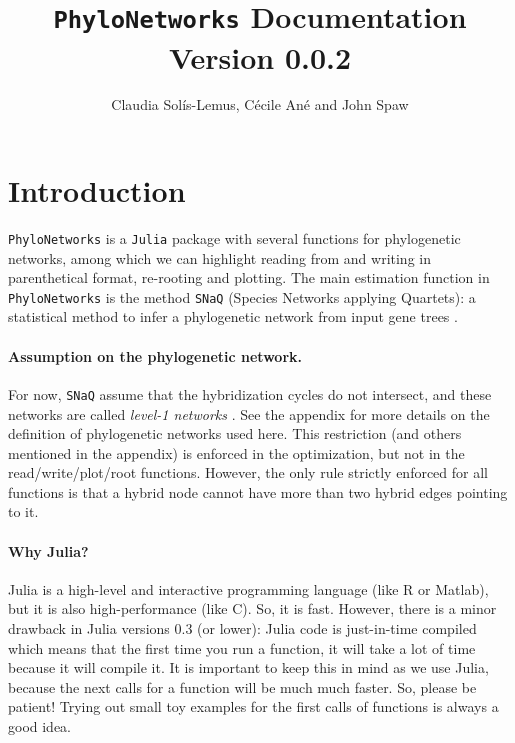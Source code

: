 \documentclass[12pt]{article}
\title{\texttt{PhyloNetworks} Documentation\\
 \large Version 0.0.2}
\author{Claudia Sol\'{i}s-Lemus, C\'{e}cile An\'{e} and John Spaw}
\begin{document}

\maketitle

\section{Introduction}
\texttt{PhyloNetworks} is a \texttt{Julia} package with several
functions for phylogenetic networks, among which we can highlight
reading from and writing in parenthetical format, re-rooting and
plotting.  The main estimation function in \texttt{PhyloNetworks} is
the method \texttt{SNaQ} (Species Networks applying Quartets): a
statistical method to infer a phylogenetic network from input gene
trees \citep{Solis-Lemus2015}.

\paragraph{Assumption on the phylogenetic network.} For now,
\texttt{SNaQ} assume that the hybridization cycles do not intersect,
and these networks are called \textit{level-1 networks}
\citep{Huson2010}. See the appendix for more details on the definition
of phylogenetic networks used here.  This restriction (and others
mentioned in the appendix) is enforced in the optimization, but not in
the read/write/plot/root functions. However, the only rule strictly
enforced for all functions is that a hybrid node cannot have more than
two hybrid edges pointing to it.

\paragraph{Why Julia?} Julia is a high-level and interactive
programming language (like R or Matlab), but it is also
high-performance (like C). So, it is fast. However, there is a minor
drawback in Julia versions 0.3 (or lower): Julia code is just-in-time
compiled which means that the first time you run a function, it will
take a lot of time because it will compile it. It is important to keep
this in mind as we use Julia, because the next calls for a function
will be much much faster. So, please be patient! Trying out small toy
examples for the first calls of functions is always a good idea.
\end{document}
